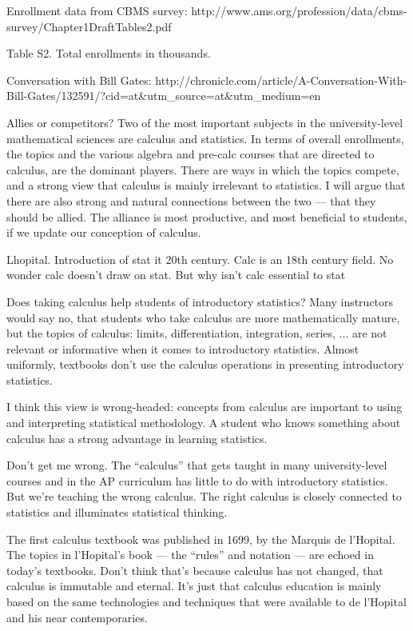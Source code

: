 

Enrollment data from CBMS survey: http://www.ams.org/profession/data/cbms-survey/Chapter1DraftTables2.pdf

Table S2.  Total enrollments in thousands.

Conversation with Bill Gates: http://chronicle.com/article/A-Conversation-With-Bill-Gates/132591/?cid=at&utm_source=at&utm_medium=en

Allies or competitors?  Two of the most important subjects in the university-level mathematical sciences are calculus and statistics. In terms of overall enrollments, the topics and the various algebra and pre-calc courses that are directed to calculus, are the dominant players.  There are ways in which the topics compete, and a strong view that calculus is mainly irrelevant to statistics. I will argue that there are also strong and natural connections between the two --- that they should be allied. The alliance is most productive, and most beneficial to students, if we update our conception of calculus.

Lhopital. Introduction of stat it 20th century. Calc is an 18th century field. No wonder calc doesn't draw on stat. But why isn't calc essential to stat


Does taking calculus help students of introductory statistics?  Many instructors would say no, that students who take calculus are more mathematically mature, but the topics of calculus: limits, differentiation, integration, series, ... are not relevant or informative when it comes to introductory statistics.  Almost uniformly, textbooks don't use the calculus operations in presenting introductory statistics.

I think this view is wrong-headed: concepts from calculus are important to using and interpreting statistical methodology.  A student who knows something about calculus has a strong advantage in learning statistics.

Don't get me wrong.  The ``calculus'' that gets taught in many university-level courses and in the AP curriculum has little to do with introductory statistics.  But we're teaching the wrong calculus.  The right calculus is closely connected to statistics and illuminates statistical thinking.

The first calculus textbook was published in 1699, by the Marquis de l'Hopital.  The topics in l'Hopital's book --- the ``rules'' and notation --- are echoed in today's textbooks.  Don't think that's because calculus has not changed, that calculus is immutable and eternal.  It's just that calculus education is mainly based on the same technologies and techniques that were available to de l'Hopital and his near contemporaries.

